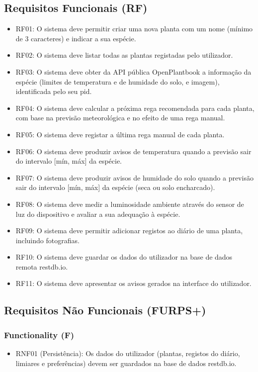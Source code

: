\documentclass[runningheads,a4paper]{llncs}
\begin{document}
\subsection{Requisitos Funcionais (RF)}

\begin{itemize}
    \item RF01: O sistema deve permitir criar uma nova planta com um nome
        (mínimo de 3 caracteres) e indicar a sua espécie.
    \item RF02: O sistema deve listar todas as plantas registadas pelo
        utilizador.
    \item RF03: O sistema deve obter da API pública OpenPlantbook
        a informação da espécie (limites de temperatura e de humidade do solo, e
        imagem), identificada pelo seu pid.
    \item RF04: O sistema deve calcular a próxima rega recomendada para
        cada planta, com base na previsão meteorológica e no efeito de uma rega
        manual.
    \item RF05: O sistema deve registar a última rega manual de cada
        planta.
    \item RF06: O sistema deve produzir avisos de temperatura quando a
        previsão sair do intervalo [mín, máx] da espécie.
    \item RF07: O sistema deve produzir avisos de humidade do solo quando
        a previsão sair do intervalo [mín, máx] da espécie (seca ou solo encharcado).
    \item RF08: O sistema deve medir a luminosidade ambiente através do
        sensor de luz do dispositivo e avaliar a sua adequação à espécie.
    \item RF09: O sistema deve permitir adicionar registos ao diário de
        uma planta, incluindo fotografias.
    \item RF10: O sistema deve guardar os dados do utilizador na base de
        dados remota restdb.io.
    \item RF11: O sistema deve apresentar os avisos gerados na interface do
        utilizador.
\end{itemize}

\subsection{Requisitos Não Funcionais (FURPS+)}

\subsubsection{Functionality (F)}
\begin{itemize}
    \item RNF01 (Persistência): Os dados do utilizador (plantas, registos
        do diário, limiares e preferências) devem ser guardados na base de dados
        restdb.io.
\end{itemize}
\end{document}
